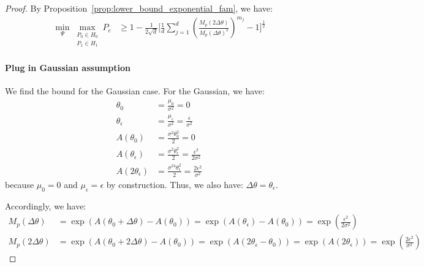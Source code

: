 \begin{proof}
    By Proposition~\ref{prop:lower_bound_exponential_fam}, we have:
\begin{align*}
      \min _{\Psi} 
    \max _{\substack{P_0 \in H_0 \\ P_1 \in H_1}}
        P_e 
        &\geq 1 - \frac{1}{2\sqrt{d}} 
        \Bigg[ \frac{1}{d} \sum_{j=1}^d
            \left(\frac{M_p(2\Delta\theta)}{M_p(\Delta \theta)^2}\right)^{m_j}
            -
            1
            \Bigg]^{\frac{1}{2}}
\end{align*}

\paragraph{Plug in Gaussian assumption} We find the bound for the Gaussian case. For the Gaussian, we have:
\begin{align*}
\theta_0 &= \frac{\mu_0}{\sigma^2} = 0\\
\theta_\epsilon &= \frac{\mu_\epsilon}{\sigma^2} = \frac{\epsilon}{\sigma^2}\\
A(\theta_0) &= \frac{\sigma^2\theta_0^2}{2} = 0\\
A(\theta_\epsilon) &= \frac{\sigma^2\theta_\epsilon^2}{2} = \frac{\epsilon^2}{2\sigma^2}\\
A(2\theta_\epsilon) &= \frac{\sigma^24\theta_\epsilon^2}{2} = \frac{2\epsilon^2}{\sigma^2}
\end{align*}
because $\mu_0 = 0$ and $\mu_\epsilon = \epsilon$ by construction. Thus, we also have: $\Delta \theta =\theta_\epsilon$. 

Accordingly, we have:
\begin{align*}
M_p(\Delta \theta) 
    &= \exp\left( A(\theta_0 + \Delta \theta) - A(\theta_0)\right)
    = \exp\left( A(\theta_\epsilon) - A(\theta_0)\right)
    = \exp\left(\frac{\epsilon^2}{2\sigma^2}\right)\\
M_p(2\Delta \theta) 
    &= \exp\left( A(\theta_0 +2 \Delta \theta) - A(\theta_0)\right)
    = \exp\left( A(2\theta_\epsilon - \theta_0)\right)
    = \exp\left( A(2\theta_\epsilon)\right)
    = \exp\left(\frac{2\epsilon^2}{\sigma^2}\right)   
\end{align*}


\end{proof}
